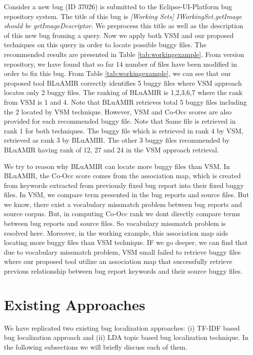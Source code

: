 \documentclass[conference]{IEEEtran}
\begin{document}
Consider a new bug (ID 37026) is submitted to the Eclipse-UI-Platform bug repository system. The title of this bug is \textit{[Working Sets] IWorkingSet.getImage should be getImageDescriptor}. We preprocess this title as well as the description of this new bug froming a query. Now we apply both VSM and our proposed techniques on this query in order to locate possible buggy files. The recommended results are presented in Table \ref{tab:workingexample}. 
From version repository, we have found that so far 14 number of files have been modified in order to fix this bug. From Table \ref{tab:workingexample}, we can see that our proposed tool BLuAMIR correctly identifies 5 buggy files where VSM approach locates only 2 buggy files. The ranking of BLuAMIR is 1,2,3,6,7 where the rank from VSM is 1 and 4. Note that BLuAMIR retrieves total 5 buggy files including the 2 located by VSM technique. However, VSM and Co-Occ scores are also provided for each recommended buggy file. 
Note that Same file is retrieved in rank 1 for both techniques. The buggy file which is retrieved in rank 4 by VSM, retrieved as rank 3 by BLuAMIR. The other 3 buggy files recommended by BLuAMIR having rank of 12, 27 and 24  in the VSM approach retrieval.

We try to reason why BLuAMIR can locate more buggy files than VSM. In BLuAMIR, the Co-Occ score comes from the association map, which is created from keywords extracted from previously fixed bug report into their fixed buggy files. In VSM, we compare term presented in the bug reports and source files. But we know, there exist a vocabulary missmatch problem between bug reports and source corpus. But, in computing Co-Occ rank we dont directly compare terms between bug reports and source files. So vocabulary missmatch problem is resolved here. Moreover, in the working example, this association map aids locating more buggy files than VSM technique. IF we go deeper, we can find that due to vocabulary missmatch problem, VSM small failed to retrieve buggy files where our proposed tool utilize an association map that successfully retrieve previous relationship between bug report keywords and their source buggy files. 

\section{Existing Approaches}\label{sec:existing}
We have replicated two existing bug localization approaches: (i) TF-IDF based bug localization approach and (ii) LDA topic based bug localization technique. In the following subsections we will briefly discuss each of them.
\end{document}
